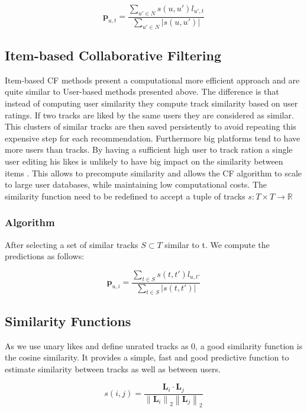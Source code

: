 \documentclass[cic,tc,english]{iiufrgs}
\newcommand{\norm}[1]{\left\lVert #1 \right\rVert_{2}}
\begin{document}
\begin{equation}
\bm{p}_{u,t} = \frac{\sum_{u' \in N} s(u,u') l_{u',t}}{\sum_{u' \in N} \vert s(u,u') \vert }
\end{equation}

\subsection{Item-based Collaborative Filtering}
Item-based CF methods present a computational more efficient approach and are quite similar to User-based methods presented above. The difference is that instead of computing user similarity they compute track similarity based on user ratings. If two tracks are liked by the same users they are considered as similar. This clusters of similar tracks are then saved persistently to avoid repeating this expensive step for each recommendation. Furthermore big platforms tend to have more users than tracks. By having a sufficient high user to track ration a single user editing his likes is unlikely to have big impact on the similarity between items \cite{ekstrand2011collaborative}. This allows to precompute similarity and allows the CF algorithm to scale to large user databases, while maintaining low computational costs. The similarity function need to be redefined to accept a tuple of tracks $s: T \times T \rightarrow \mathbb{R}$ 

\subsubsection{Algorithm}

After selecting a set of similar tracks $S \subset T$ similar to t. We compute the predictions as follows:

\begin{equation}
\bm{p}_{u,i} = \frac{\sum_{t \in S} s(t,t')l_{u,t'}} {\sum_{t \in S} \vert s(t,t') \vert}
\end{equation}

\subsection{Similarity Functions}
As we use unary likes and define unrated tracks as $0$, a good similarity function is the cosine similarity. It provides a simple, fast and good predictive function to estimate similarity between tracks as well as between users. 

\begin{equation}
 s(i,j) = \frac{\mathbf{L}_i \cdot \mathbf{L}_j}  {\norm{\mathbf{L}_i} \norm{\mathbf{L}_j}}
\end{equation}
\end{document}
